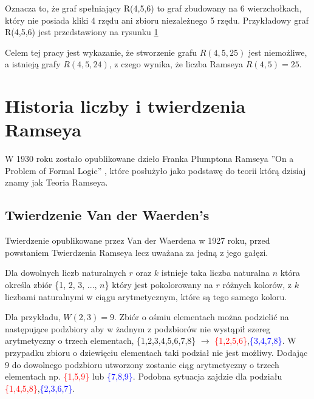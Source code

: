 Oznacza to, że graf spełniający R(4,5,6) to graf zbudowany na 6 wierzchołkach, który nie posiada kliki 4 rzędu ani zbioru niezależnego 5 rzędu. Przykładowy graf R(4,5,6) jest przedstawiony na rysunku \ref{pgram}

 \begin{figure}[H]
  \centering
    \caption{}
    \label{pgram}
 \end{figure}

Celem tej pracy jest wykazanie, że stworzenie grafu $R(4,5,25)$ jest niemożliwe, a istnieją grafy $R(4,5,24)$, z czego wynika, że liczba Ramseya $R(4,5) = 25$.


\section{Historia liczby i twierdzenia Ramseya}

W 1930 roku zostało opublikowane dzieło Franka Plumptona Ramseya ''On a Problem of Formal Logic''\cite{ramsey} , które posłużyło jako podstawę do teorii którą dzisiaj znamy jak Teoria Ramseya. 


\subsection{Twierdzenie Van der Waerden's}
Twierdzenie opublikowane przez Van der Waerdena w 1927 roku, przed powstaniem Twierdzenia Ramseya lecz uważana za jedną z jego gałęzi. 

\begin{theorem}
Dla dowolnych liczb naturalnych $r$ oraz $k$ istnieje taka liczba naturalna $n$ która określa zbiór \{1, 2, 3, ..., $n$\} który jest pokolorowany na $r$ różnych kolorów, z $k$ liczbami naturalnymi w ciągu arytmetycznym, które są tego samego koloru.\cite{theory} 
\end{theorem}

Dla przykładu, $W(2,3) = 9$. Zbiór o ośmiu elementach można podzielić na następujące podzbiory aby w żadnym z podzbiorów nie wystąpił szereg arytmetyczny o trzech elementach, \{1,2,3,4,5,6,7,8\} $\to$ \textcolor{red}{\{1,2,5,6\}},\textcolor{blue}{\{3,4,7,8\}}. W przypadku zbioru o dziewięciu elementach taki podział nie jest możliwy. Dodając 9 do dowolnego podzbioru utworzony zostanie ciąg arytmetyczny o trzech elementach np. \textcolor{red}{\{1,5,9\}} lub \textcolor{blue}{\{7,8,9\}}. Podobna sytuacja zajdzie dla podziału \textcolor{red}{\{1,4,5,8\}},\textcolor{blue}{\{2,3,6,7\}}.

